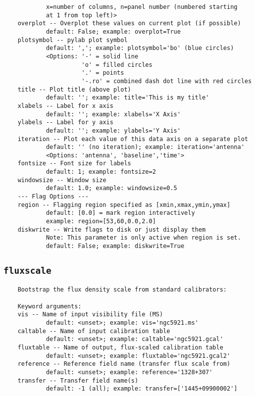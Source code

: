 \begin{verbatim}
            x=number of columns, n=panel number (numbered starting
            at 1 from top left)>
    overplot -- Overplot these values on current plot (if possible)
            default: False; example: overplot=True
    plotsymbol -- pylab plot symbol
            default: ','; example: plotsymbol='bo' (blue circles)
            <Options: '-' = solid line
                      'o' = filled circles
                      '.' = points
                      '-.ro' = combined dash dot line with red circles
    title -- Plot title (above plot)
            default: ''; example: title='This is my title'
    xlabels -- Label for x axis
            default: ''; example: xlabels='X Axis'
    ylabels -- Label for y axis
            default: ''; example: ylabels='Y Axis'
    iteration -- Plot each value of this data axis on a separate plot
            default: '' (no iteration); example: iteration='antenna'
            <Options: 'antenna', 'baseline','time'>
    fontsize -- Font size for labels
            default: 1; example: fontsize=2
    windowsize -- Window size
            default: 1.0; example: windowsize=0.5
    --- Flag Options ---
    region -- Flagging region specified as [xmin,xmax,ymin,ymax]
            default: [0.0] = mark region interactively
            example: region=[53,60,0.0,2.0]
    diskwrite -- Write flags to disk or just display them
            Note: This parameter is only active when region is set.
            default: False; example: diskwrite=True
\end{verbatim}
\normalsize


\subsection{{\tt fluxscale}}
\label{section:tasks.fluxscale}

\small
\begin{verbatim}
    Bootstrap the flux density scale from standard calibrators:
    
    Keyword arguments:
    vis -- Name of input visibility file (MS)
            default: <unset>; example: vis='ngc5921.ms'
    caltable -- Name of input calibration table
            default: <unset>; example: caltable='ngc5921.gcal'
    fluxtable -- Name of output, flux-scaled calibration table
            default: <unset>; example: fluxtable='ngc5921.gcal2'
    reference -- Reference field name (transfer flux scale from)
            default: <unset>; example: reference='1328+307'
    transfer -- Transfer field name(s)
            default: -1 (all); example: transfer=['1445+09900002']
\end{verbatim}
\normalsize


